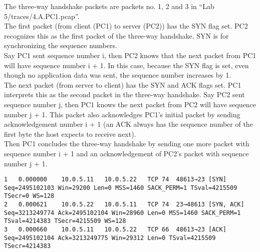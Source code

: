 The three-way handshake packets are packets no. 1, 2 and 3 in ``Lab 5/traces/4.A.PC1.pcap''. \\

The first packet (from client (PC1) to server (PC2)) has the SYN flag set. PC2 recognizes this
as the first packet of the three-way handshake. SYN is for synchronizing the sequence numbers. \\
Say PC1 sent sequence number i, then PC2 knows that the next packet from PC1 will have sequence
number i + 1. In this case, because the SYN flag is set, even though no application data
was sent, the sequence number increases by 1. \\

The next packet (from server to client) has the SYN and ACK flags set.
PC1 interprets this as the second packet in the three-way handshake.
Say PC2 sent sequence number j, then PC1 knows the next packet from PC2 will
have sequence number j + 1. This packet also acknowledges PC1's initial packet
by sending acknowledgement number i + 1 (an ACK always has the sequence number
of the first byte the host expects to receive next). \\

Then PC1 concludes the three-way handshake by sending one more packet with
sequence number i + 1 and an acknowledgement of PC2's packet with sequence number j + 1.
\\


\begin{lstlisting}
1	0.000000	10.0.5.11	10.0.5.22	TCP	74	48613→23 [SYN] Seq=2495102103 Win=29200 Len=0 MSS=1460 SACK_PERM=1 TSval=4215509 TSecr=0 WS=128
2	0.000621	10.0.5.22	10.0.5.11	TCP	74	23→48613 [SYN, ACK] Seq=3213249774 Ack=2495102104 Win=28960 Len=0 MSS=1460 SACK_PERM=1 TSval=4214383 TSecr=4215509 WS=128
3	0.000660	10.0.5.11	10.0.5.22	TCP	66	48613→23 [ACK] Seq=2495102104 Ack=3213249775 Win=29312 Len=0 TSval=4215509 TSecr=4214383
\end{lstlisting}
